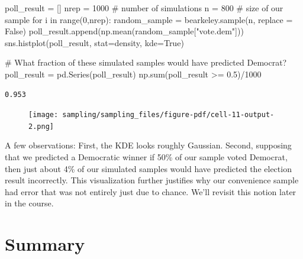 \documentclass[
  letterpaper,
  DIV=11,
  numbers=noendperiod]{scrreprt}
\newenvironment{Shaded}{\begin{snugshade}}{\end{snugshade}}
\newcommand{\BuiltInTok}[1]{\textcolor[rgb]{0.00,0.23,0.31}{#1}}
\newcommand{\CommentTok}[1]{\textcolor[rgb]{0.37,0.37,0.37}{#1}}
\newcommand{\ControlFlowTok}[1]{\textcolor[rgb]{0.00,0.23,0.31}{#1}}
\newcommand{\DecValTok}[1]{\textcolor[rgb]{0.68,0.00,0.00}{#1}}
\newcommand{\FloatTok}[1]{\textcolor[rgb]{0.68,0.00,0.00}{#1}}
\newcommand{\KeywordTok}[1]{\textcolor[rgb]{0.00,0.23,0.31}{#1}}
\newcommand{\NormalTok}[1]{\textcolor[rgb]{0.00,0.23,0.31}{#1}}
\newcommand{\OperatorTok}[1]{\textcolor[rgb]{0.37,0.37,0.37}{#1}}
\newcommand{\StringTok}[1]{\textcolor[rgb]{0.13,0.47,0.30}{#1}}
\newcommand{\VariableTok}[1]{\textcolor[rgb]{0.07,0.07,0.07}{#1}}
\begin{document}
\begin{Shaded}
\begin{Highlighting}[]
\NormalTok{poll\_result }\OperatorTok{=}\NormalTok{ []}
\NormalTok{nrep }\OperatorTok{=} \DecValTok{1000}   \CommentTok{\# number of simulations}
\NormalTok{n }\OperatorTok{=} \DecValTok{800}       \CommentTok{\# size of our sample}
\ControlFlowTok{for}\NormalTok{ i }\KeywordTok{in} \BuiltInTok{range}\NormalTok{(}\DecValTok{0}\NormalTok{,nrep):}
\NormalTok{    random\_sample }\OperatorTok{=}\NormalTok{ bearkeley.sample(n, replace }\OperatorTok{=} \VariableTok{False}\NormalTok{)}
\NormalTok{    poll\_result.append(np.mean(random\_sample[}\StringTok{"vote.dem"}\NormalTok{]))}
\NormalTok{sns.histplot(poll\_result, stat}\OperatorTok{=}\StringTok{\textquotesingle{}density\textquotesingle{}}\NormalTok{, kde}\OperatorTok{=}\VariableTok{True}\NormalTok{)}

\CommentTok{\# What fraction of these simulated samples would have predicted Democrat?}
\NormalTok{poll\_result }\OperatorTok{=}\NormalTok{ pd.Series(poll\_result)}
\NormalTok{np.}\BuiltInTok{sum}\NormalTok{(poll\_result }\OperatorTok{\textgreater{}=} \FloatTok{0.5}\NormalTok{)}\OperatorTok{/}\DecValTok{1000}
\end{Highlighting}
\end{Shaded}

\begin{verbatim}
0.953
\end{verbatim}

\begin{figure}[H]

{\centering \texttt{[image: sampling/sampling\_files/figure-pdf/cell-11-output-2.png]}

}

\end{figure}

A few observations: First, the KDE looks roughly Gaussian. Second,
supposing that we predicted a Democratic winner if 50\% of our sample
voted Democrat, then just about 4\% of our simulated samples would have
predicted the election result incorrectly. This visualization further
justifies why our convenience sample had error that was not entirely
just due to chance. We'll revisit this notion later in the course.

\hypertarget{summary}{%
\section{Summary}\label{summary}}
\end{document}
